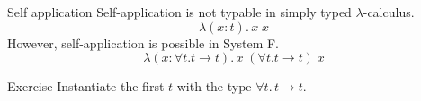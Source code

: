 %  

\begin{frame}{Self application}
Self-application is not typable in simply typed $\lambda$-calculus. 
  \[
    \lambda (x : t).\, x\; x
  \]
  However, self-application is possible in System F. 
  \[
    \lambda (x : \forall t. t\to t).\, x\;(\forall t. t\to t)\;x
  \]
  \begin{block}{Exercise}
    Instantiate the first $t$ with the type $\forall t.\, t \to t$.  
  \end{block}
\end{frame}

